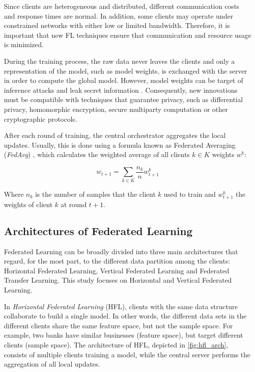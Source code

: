 Since clients are heterogeneous and distributed, different communication costs and response times are normal. In addition, some clients may operate under constrained networks with either low or limited bandwidth. Therefore, it is important that new FL techniques ensure that communication and resource usage is minimized.

During the training process, the raw data never leaves the clients and only a representation of the model, such as model weights, is exchanged with the server in order to compute the global model. However, model weights can be target of inference attacks and leak secret information \cite{10.1145/3298981}.  Consequently, new innovations must be compatible with techniques that guarantee privacy, such as differential privacy, homomorphic encryption, secure multiparty computation or other cryptographic protocols.

After each round of training, the central orchestrator aggregates the local updates. Usually, this is done using a formula known as Federated Averaging (\textit{FedAvg}) \cite{10.48550/arxiv.1602.05629}, which calculates the weighted average of all clients $k \in K$ weights $w^k$:

\begin{equation}
w_{t+1} = \sum_{k \in K} \frac{n_k}{n} w_{t+1}^k
\end{equation} \label{eq:fedavg}

Where $n_k$ is the number of samples that the client $k$ used to train and $w_{t+1}^k$ the weights of client $k$ at round $t+1$.

\subsection{Architectures of Federated Learning}\label{background:archfl}

Federated Learning can be broadly divided into three main architectures \cite{10.1145/3298981, 10.1145/3412357} that regard, for the most part, to the different data partition among the clients: Horizontal Federated Learning, Vertical Federated Learning and Federated Transfer Learning. This study focuses on Horizontal and Vertical Federated Learning.

In \textit{Horizontal Federated Learning} (HFL), clients with the same data structure collaborate to build a single model. In other words, the different data sets in the different clients share the same feature space, but not the sample space. For example, two banks have similar businesses (feature space), but target different clients (sample space). The architecture of HFL, depicted in \autoref{fig:hfl_arch}, consists of multiple clients training a model, while the central server performs the aggregation of all local updates.

